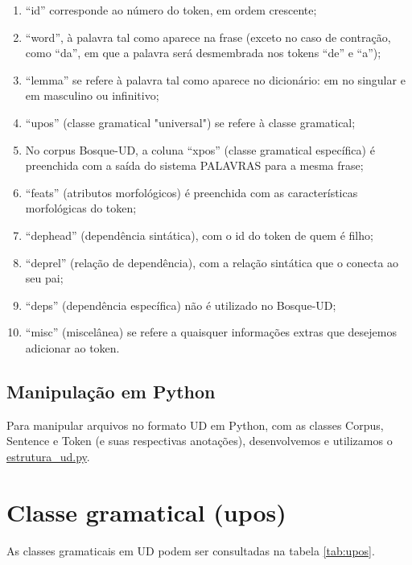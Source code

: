 \documentclass[output=paper,colorlinks,citecolor=brown]{langscibook}
\begin{document}
\begin{enumerate}
    \item “id” corresponde ao número do token, em ordem crescente;
    \item “word”, à palavra tal como aparece na frase (exceto no caso de contração, como “da”, em que a palavra será desmembrada nos tokens “de” e “a”);
    \item “lemma” se refere à palavra tal como aparece no dicionário: em no singular e em masculino ou infinitivo;
    \item “upos” (classe gramatical "universal") se refere à classe gramatical;
    \item No corpus Bosque-UD, a coluna “xpos” (classe gramatical específica) é preenchida com a saída do sistema PALAVRAS para a mesma frase;
    \item “feats” (atributos morfológicos) é preenchida com as características morfológicas do token;
    \item “dephead” (dependência sintática), com o id do token de quem é filho;
    \item “deprel” (relação de dependência), com a relação sintática que o conecta ao seu pai;
    \item “deps” (dependência específica) não é utilizado no Bosque-UD;
    \item “misc” (miscelânea) se refere a quaisquer informações extras que desejemos adicionar ao token.
\end{enumerate}{}

\subsection{Manipulação em Python}\label{sec:python}

Para manipular arquivos no formato UD em Python, com as classes Corpus, Sentence e Token (e suas respectivas anotações), desenvolvemos e utilizamos o \href{https://github.com/alvelvis/ACDC-UD/blob/master/estrutura_ud.py}{estrutura\_ud.py}.

\section{Classe gramatical (upos)}\label{sec:upos}

As classes gramaticais em UD podem ser consultadas na tabela \ref{tab:upos}.
\end{document}
